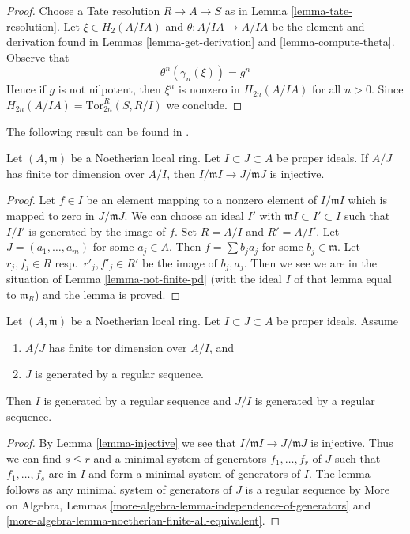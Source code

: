 \begin{proof}
Choose a Tate resolution $R \to A \to S$ as in
Lemma \ref{lemma-tate-resolution}.
Let $\xi \in H_2(A/IA)$ and $\theta : A/IA \to A/IA$ be the element
and derivation found in Lemmas \ref{lemma-get-derivation} and
\ref{lemma-compute-theta}.
Observe that
$$
\theta^n(\gamma_n(\xi)) = g^n
$$
Hence if $g$ is not nilpotent, then $\xi^n$ is nonzero in
$H_{2n}(A/IA)$ for all $n > 0$. Since
$H_{2n}(A/IA) = \text{Tor}^R_{2n}(S, R/I)$ we conclude.
\end{proof}

\noindent
The following result can be found in \cite{Rodicio}.

\begin{lemma}
\label{lemma-injective}
Let $(A, \mathfrak m)$ be a Noetherian local ring. Let
$I \subset J \subset A$ be proper ideals. If $A/J$ has finite
tor dimension over $A/I$, then $I/\mathfrak m I \to J/\mathfrak m J$
is injective.
\end{lemma}

\begin{proof}
Let $f \in I$ be an element mapping to a nonzero element of $I/\mathfrak m I$
which is mapped to zero in $J/\mathfrak mJ$. We can choose an ideal $I'$
with $\mathfrak mI \subset I' \subset I$ such that $I/I'$ is generated by
the image of $f$. Set $R = A/I$ and $R' = A/I'$. Let $J = (a_1, \ldots, a_m)$
for some $a_j \in A$. Then $f = \sum b_j a_j$ for some $b_j \in \mathfrak m$.
Let $r_j, f_j \in R$ resp.\ $r'_j, f'_j \in R'$ be the image of $b_j, a_j$.
Then we see we are
in the situation of Lemma \ref{lemma-not-finite-pd}
(with the ideal $I$ of that lemma equal to $\mathfrak m_R$)
and the lemma is proved.
\end{proof}

\begin{lemma}
\label{lemma-regular-sequence}
Let $(A, \mathfrak m)$ be a Noetherian local ring. Let
$I \subset J \subset A$ be proper ideals. Assume
\begin{enumerate}
\item $A/J$ has finite tor dimension over $A/I$, and
\item $J$ is generated by a regular sequence.
\end{enumerate}
Then $I$ is generated by a regular sequence and $J/I$
is generated by a regular sequence.
\end{lemma}

\begin{proof}
By Lemma \ref{lemma-injective} we see that
$I/\mathfrak m I \to J/\mathfrak m J$
is injective. Thus we can find $s \leq r$ and a minimal system of
generators $f_1, \ldots, f_r$ of $J$ such that $f_1, \ldots, f_s$ are in $I$
and form a minimal system of generators of $I$.
The lemma follows as any minimal system of generators of $J$
is a regular sequence by
More on Algebra, Lemmas
\ref{more-algebra-lemma-independence-of-generators} and
\ref{more-algebra-lemma-noetherian-finite-all-equivalent}.
\end{proof}

